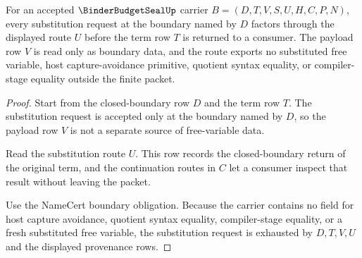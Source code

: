\begin{theorem}
\label{thm:binder-budget-seal-substitution-nonescape}
For an accepted $\BinderBudgetSealUp$ carrier $B=(D,T,V,S,U,H,C,P,N)$, every substitution request at the boundary named by $D$ factors through the displayed route $U$ before the term row $T$ is returned to a consumer. The payload row $V$ is read only as boundary data, and the route exports no substituted free variable, host capture-avoidance primitive, quotient syntax equality, or compiler-stage equality outside the finite packet.
\end{theorem}
\begin{proof}
Start from the closed-boundary row $D$ and the term row $T$. The substitution request is accepted only at the boundary named by $D$, so the payload row $V$ is not a separate source of free-variable data.

Read the substitution route $U$. This row records the closed-boundary return of the original term, and the continuation routes in $C$ let a consumer inspect that result without leaving the packet.

Use the NameCert boundary obligation. Because the carrier contains no field for host capture avoidance, quotient syntax equality, compiler-stage equality, or a fresh substituted free variable, the substitution request is exhausted by $D,T,V,U$ and the displayed provenance rows.
\end{proof}

